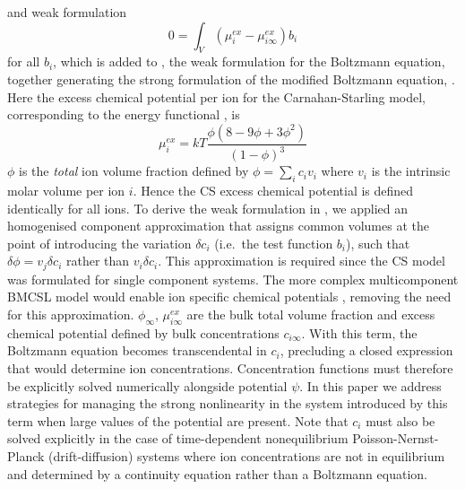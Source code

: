 and weak formulation
\begin{equation}
    0 = \int_{V} (\mu_i^{ex}-\mu_{i\infty}^{ex}) b_i
    \label{weak_CS}
\end{equation}
for all $b_i$, which is added to , the weak
formulation for the Boltzmann equation, together generating the strong
formulation of the modified Boltzmann
equation,  .  Here the excess chemical potential
per ion for the Carnahan-Starling model, corresponding to the energy
functional , is
\begin{equation}
    \mu_{i}^{ex} = kT \frac{\phi(8-9\phi+3\phi^2)}{(1-\phi)^3}
    \label{chem_pot_CS}
\end{equation}
$\phi$ is the \emph{total} ion volume fraction defined by
$\phi=\sum_i c_i v_i$ where $v_i$ is the intrinsic molar volume per
ion $i$. Hence the CS excess chemical potential is defined identically
for all ions. To derive the weak formulation in , we
applied an homogenised component approximation that assigns common
volumes at the point of introducing the variation  $\delta c_i$ (i.e.\
the test function $b_i$), such that $\delta\phi=v_j \delta c_i$ rather 
than $v_i \delta c_i$. This approximation is required since the CS
model was formulated for single component systems. The more complex
multicomponent BMCSL model would enable ion specific chemical
potentials \citep{MansooriCarnahanStarlingLeland1971}, removing the
need for this approximation.  $\phi_{\infty}$, $\mu_{i\infty}^{ex}$
are the bulk total volume fraction and excess chemical potential
defined by bulk concentrations $c_{i\infty}$. With this term, the
Boltzmann equation \eqnref{general_Boltzmann} becomes transcendental in $c_i$, precluding a closed
expression that would determine ion concentrations. Concentration functions must therefore be
explicitly solved  numerically alongside potential $\psi$. In this
paper we address strategies for managing the strong nonlinearity in
the system introduced by this term when large values of the
potential are present. Note that $c_i$ must also be solved explicitly in the case
of time-dependent nonequilibrium Poisson-Nernst-Planck (drift-diffusion) systems \citep{LopezGarciaHornoGrosse2018} where
ion concentrations are not in equilibrium and determined by a
continuity equation rather than a Boltzmann equation.

